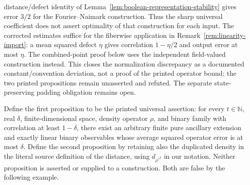 \begin{remark}
	distance/defect identity of Lemma~\ref{lem:boolean-representation-stability}
	gives error $3/2$ for the Fourier--Naimark construction. Thus the sharp
	universal coefficient does not assert optimality of that construction for
	each input. The corrected estimates suffice for the fiberwise application
	in Remark~\ref{rem:linearity-import}: a mean squared defect $\eta$ gives
	correlation $1-\eta/2$ and output error at most $\eta$. The combined-point
	proof below uses the independent field-valued construction instead.
	This closes the normalization discrepancy as a documented
	constant/convention deviation, not a proof of the printed operator bound;
	the two printed propositions remain unasserted and refuted. The separate
	state-preserving padding obligation remains open.
\end{remark}

\begin{definition}
	\label{def:linearity-printed-claim}
	\leanok
	Define the first proposition to be the printed universal assertion: for every
	$t\in\mathbb N$, real $\delta$, finite-dimensional space, density operator
	$\rho$, and binary family with correlation at least $1-\delta$, there
	exist an arbitrary finite pure ancillary extension and exactly linear
	binary observables whose average squared operator error is at most
	$\delta$. Define the second proposition by retaining also the duplicated
	density in the literal source definition of the distance, using
	$d_{\rho'^2}$ in our notation. Neither proposition is asserted or supplied to
	a construction. Both are false by the following example.
\end{definition}

